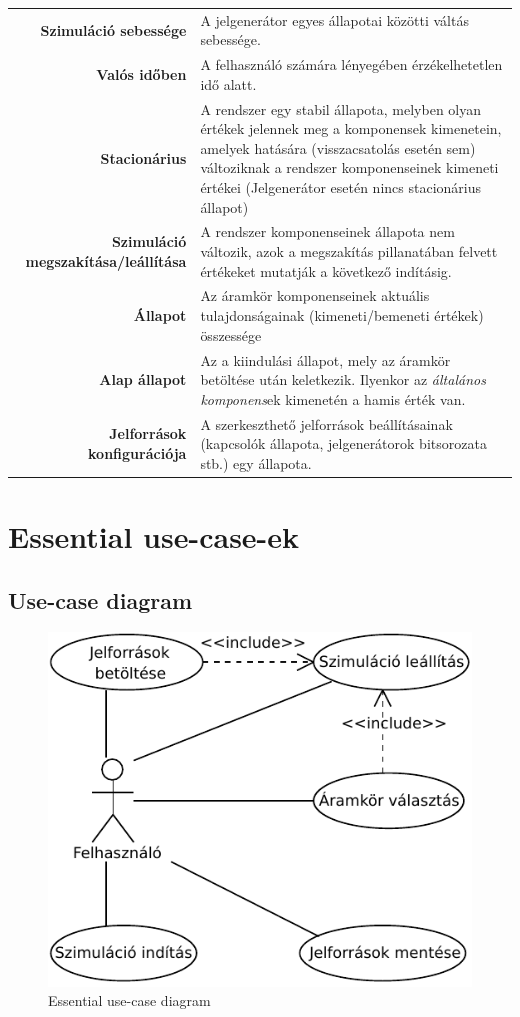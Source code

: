 \begin{longtable}{r p{10.95cm}}
\textbf{Szimuláció sebessége} & A jelgenerátor egyes állapotai közötti váltás sebessége. \\
\textbf{Valós időben} & A felhasználó számára lényegében érzékelhetetlen idő alatt.\\
\textbf{Stacionárius} & A rendszer egy stabil állapota, melyben olyan értékek jelennek meg a komponensek kimenetein, amelyek hatására (visszacsatolás esetén sem) változiknak a rendszer komponenseinek kimeneti értékei (Jelgenerátor esetén nincs stacionárius állapot)\\
\textbf{Szimuláció megszakítása/leállítása} & A rendszer komponenseinek állapota nem változik, azok a megszakítás pillanatában felvett értékeket mutatják a következő indításig.\\
\textbf{Állapot} & Az áramkör komponenseinek aktuális tulajdonságainak (kimeneti/bemeneti értékek) összessége \\
\textbf{Alap állapot} & Az a kiindulási állapot, mely az áramkör betöltése után keletkezik. Ilyenkor az \emph{általános komponens}ek kimenetén a hamis érték van.\\
\textbf{Jelforrások konfigurációja} & A szerkeszthető jelforrások beállításainak (kapcsolók állapota, jelgenerátorok bitsorozata stb.) egy állapota.
\end{longtable}

\section{Essential use-case-ek}

\subsection{Use-case diagram}
\label{sec:usecasediagram}

\begin{figure}[H]
\begin{center}
\includegraphics{chapters/chapter02/usecase.pdf}
\caption{Essential use-case diagram}
\label{fig:useCase1}
\end{center}
\end{figure}

